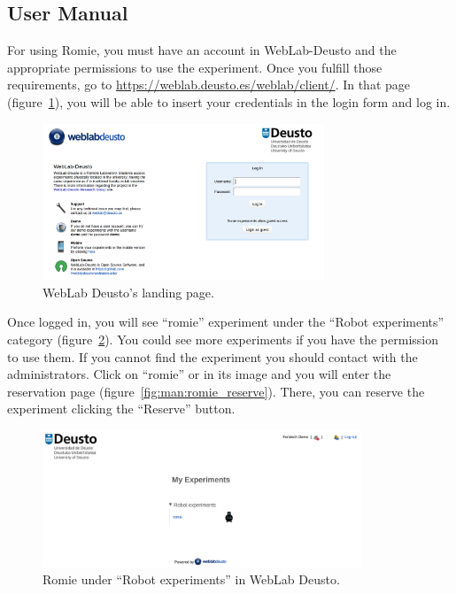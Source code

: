 \subsection{User Manual}

For using Romie, you must have an account in WebLab-Deusto and the appropriate permissions to use
the experiment. Once you fulfill those requirements, go to
\url{https://weblab.deusto.es/weblab/client/}. In that page (figure~\ref{fig:man:weblab}), you will
be able to insert your credentials in the login form and log in.

\begin{figure}[ht]
	\centering
	\includegraphics[width=0.75\textwidth]{fig/manuals/weblab}
	\caption{WebLab Deusto's landing page.}
	\label{fig:man:weblab}
\end{figure}

Once logged in, you will see ``romie'' experiment under the ``Robot experiments'' category
(figure~\ref{fig:man:romie_weblab}). You could see more experiments if you have the permission to
use them. If you cannot find the experiment you should contact with the administrators. Click on
``romie'' or in its image and you will enter the reservation page
(figure~\ref{fig:man:romie_reserve}). There, you can reserve the experiment clicking the ``Reserve''
button.

\begin{figure}[!htbp]
	\centering
	\includegraphics[width=0.85\textwidth]{fig/manuals/trivial/romie-weblab}
	\caption{Romie under ``Robot experiments'' in WebLab Deusto.}
	\label{fig:man:romie_weblab}
\end{figure}

